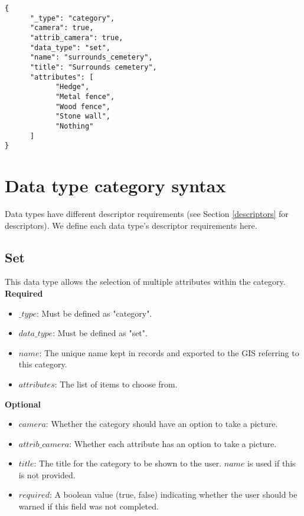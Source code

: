 \documentclass{scrreprt}
\begin{document}
\begin{verbatim}
{
      "_type": "category",
      "camera": true,
      "attrib_camera": true,
      "data_type": "set",
      "name": "surrounds_cemetery",
      "title": "Surrounds cemetery",
      "attributes": [
            "Hedge",
            "Metal fence",
            "Wood fence",
            "Stone wall",
            "Nothing"
      ]
}
\end{verbatim}

\section{Data type category syntax}
\label{sec_data_types}
Data types have different descriptor requirements (see Section \ref{descriptors} for descriptors). We define each data type's descriptor requirements here.

\subsection{Set}
This data type allows the selection of multiple attributes within the category.\\
\textbf{Required}
\begin{itemize}
\item $\_type$:  Must be defined as "category".
\item $data\_type$: Must be defined as "set".
\item $name$: The unique name kept in records and exported to the GIS referring to this category.
\item $attributes$: The list of items to choose from.
\end{itemize}
\textbf{Optional}
\begin{itemize}
\item $camera$: Whether the category should have an option to take a picture.
\item $attrib\_camera$: Whether each attribute has an option to take a picture.
\item $title$: The title for the category to be shown to the user. $name$ is used if this is not provided.
\item $required$: A boolean value (true, false) indicating whether the user should be warned if this field was not completed.
\end{itemize}

\newpage
\end{document}
